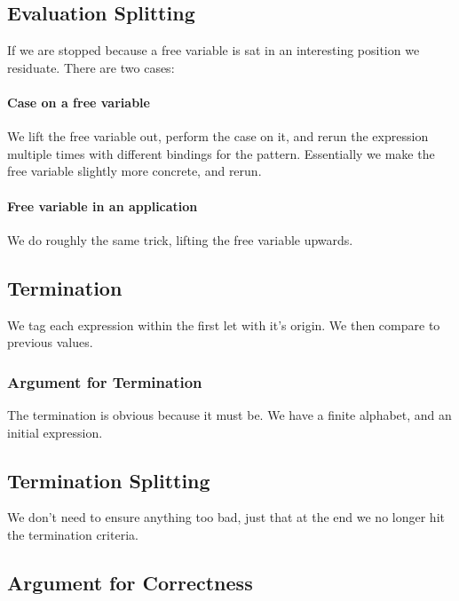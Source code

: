 \documentclass{sigplanconf}
\begin{document}
\subsection{Evaluation Splitting}
\label{sec:eval_split}

If we are stopped because a free variable is sat in an interesting position we residuate. There are two cases:

\paragraph{Case on a free variable}

We lift the free variable out, perform the case on it, and rerun the expression multiple times with different bindings for the pattern. Essentially we make the free variable slightly more concrete, and rerun.

\paragraph{Free variable in an application}

We do roughly the same trick, lifting the free variable upwards.



\subsection{Termination}
\label{sec:term}

We tag each expression within the first let with it's origin. We then compare to previous values.

\subsubsection{Argument for Termination}

The termination is obvious because it must be. We have a finite alphabet, and an initial expression.


\subsection{Termination Splitting}
\label{sec:term_split}

We don't need to ensure anything too bad, just that at the end we no longer hit the termination criteria.


\subsection{Argument for Correctness}
\end{document}
